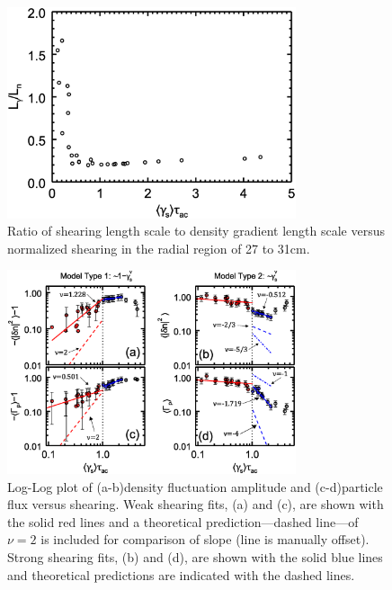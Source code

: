 \documentclass[aip,pop,amsmath,amssymb,reprint,superscriptaddress]{revtex4-1} %
\begin{document}
\begin{figure}[!htbp]
\centerline{
\includegraphics[width=8.5cm]{figure5.eps}}
\caption{\label{fig:LgammaLn} Ratio of shearing length scale to density gradient length scale versus normalized shearing in the radial region of 27 to 31cm.}
\end{figure}

\begin{figure}[!htbp]
\centerline{
\includegraphics[width=8.5cm]{figure6.eps}}
\caption{\label{fig:densloglog_strong} Log-Log plot of (a-b)density fluctuation amplitude and (c-d)particle flux versus shearing. Weak shearing fits, (a) and (c), are shown with the solid red lines and a theoretical prediction---dashed line---of $\nu = 2$ is included for comparison of slope (line is manually offset). Strong shearing fits, (b) and (d), are shown with the solid blue lines and theoretical predictions are indicated with the dashed lines.}
\end{figure}
\end{document}
